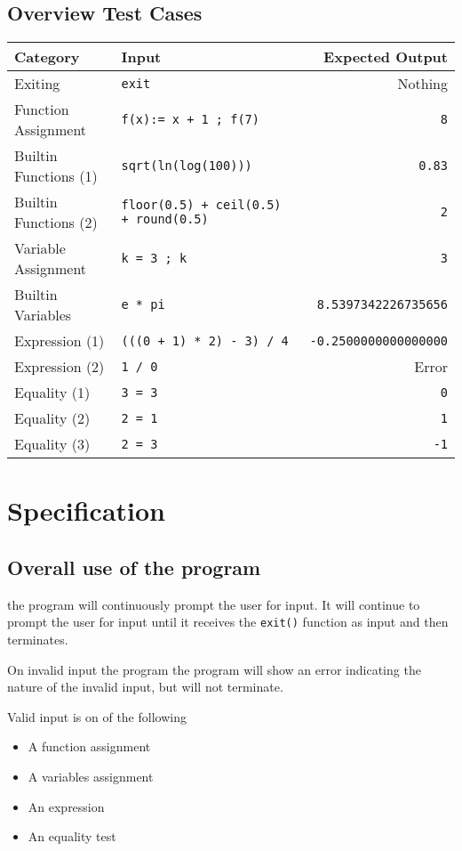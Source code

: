 \documentclass[11pt,a4paper]{article}
\begin{document}
\subsection{Overview Test Cases}

\begin{center}
\begin{tabular}{llr}
Category & Input & Expected Output\\
\hline
Exiting & \texttt{exit} & Nothing\\
Function Assignment & \texttt{f(x):= x + 1 ; f(7)} & \texttt{8}\\
Builtin Functions (1) & \texttt{sqrt(ln(log(100)))} & \texttt{0.83}\\
Builtin Functions (2) & \texttt{floor(0.5) + ceil(0.5) + round(0.5)} & \texttt{2}\\
Variable Assignment & \texttt{k = 3 ; k} & \texttt{3}\\
Builtin Variables & \texttt{e * pi} & \texttt{8.5397342226735656}\\
Expression (1) & \texttt{(((0 + 1) * 2) - 3) / 4} & \texttt{-0.2500000000000000}\\
Expression (2) & \texttt{1 / 0} & Error\\
Equality (1) & \texttt{3 = 3} & \texttt{0}\\
Equality (2) & \texttt{2 = 1} & \texttt{1}\\
Equality (3) & \texttt{2 = 3} & \texttt{-1}\\
\end{tabular}
\end{center}


\appendix
\section{Specification} \label{app:specification}
\subsection{Overall use of the program}
the program will continuously prompt the user for input. It will
continue to prompt the user for input until it receives the
\texttt{exit()} function as input and then terminates.

On invalid input the program the program will show an error
indicating the nature of the invalid input, but will not terminate.

Valid input is on of the following
\begin{itemize}
\item A function assignment
\item A variables assignment
\item An expression
\item An equality test
\end{itemize}
\end{document}
